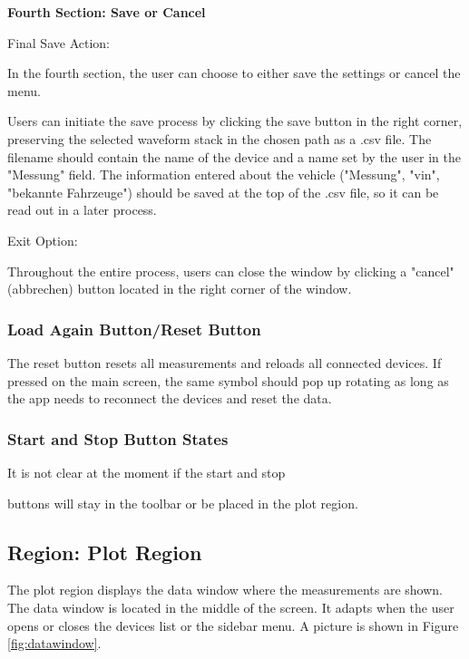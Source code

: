 \documentclass[]{scrreprt}
\begin{document}
\textbf{Fourth Section: Save or Cancel}

Final Save Action:

In the fourth section, the user can choose to either save the settings or cancel the menu.

Users can initiate the save process by clicking the save button in the right corner, preserving the selected waveform stack in the chosen path as a .csv file. The filename should contain the name of the device and a name set by the user in the "Messung" field. The information entered about the vehicle ("Messung", "vin", "bekannte Fahrzeuge") should be saved at the top of the .csv file, so it can be read out in a later process.

Exit Option:

Throughout the entire process, users can close the window by clicking a "cancel" (abbrechen) button located in the right corner of the window.

\subsubsection{Load Again Button/Reset Button}

The reset button resets all measurements and reloads all connected devices. If pressed on the main screen, the same symbol should pop up rotating as long as the app needs to reconnect the devices and reset the data.

\subsubsection{Start and Stop Button States}

It is not clear at the moment if the start and stop

 buttons will stay in the toolbar or be placed in the plot region.

\subsection{Region: Plot Region}

The plot region displays the data window where the measurements are shown. The data window is located in the middle of the screen. It adapts when the user opens or closes the devices list or the sidebar menu. A picture is shown in Figure \ref{fig:datawindow}.
\end{document}

